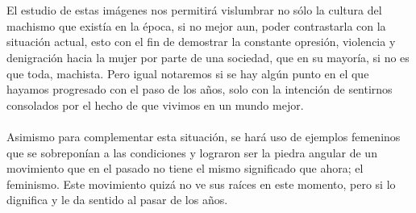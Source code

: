 \documentclass{report}
\begin{document}
\\\\
El estudio de estas imágenes nos permitirá vislumbrar no sólo la cultura del machismo que existía en la época, si no mejor aun, poder contrastarla con la situación actual, esto con el fin de demostrar la constante opresión, violencia y denigración hacia la mujer por parte de una sociedad, que en su mayoría, si no es que toda, machista. Pero igual notaremos si se hay algún punto en el que hayamos progresado con el paso de los años, solo con la intención de sentirnos consolados por el hecho de que vivimos en un mundo mejor. 
\\\\
Asimismo para complementar esta situación, se hará uso de ejemplos femeninos que se sobreponían a las condiciones y lograron ser la piedra angular de un movimiento que en el pasado no tiene el mismo significado que ahora; el feminismo. Este movimiento quizá no ve sus raíces en este momento, pero si lo dignifica y le da sentido al pasar de los años.  
\newpage
\end{document}
